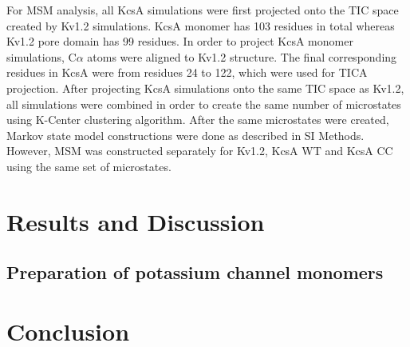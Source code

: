 For MSM analysis, all KcsA simulations were first projected onto the TIC space created by Kv1.2 simulations. KcsA monomer has 103 residues in total whereas Kv1.2 pore domain has 99 residues. In order to project KcsA monomer simulations, C$\alpha$ atoms were aligned to Kv1.2 structure. The final corresponding residues in KcsA were from residues 24 to 122, which were used for TICA projection. After projecting KcsA simulations onto the same TIC space as Kv1.2, all simulations were combined in order to create the same number of microstates using K-Center clustering algorithm. After the same microstates were created, Markov state model constructions were done as described in SI Methods. However, MSM was constructed separately for Kv1.2, KcsA WT and KcsA CC using the same set of microstates.

\section{Results and Discussion}
\subsection{Preparation of potassium channel monomers}
\subsection{}
\section{Conclusion}

\renewcommand\thefigure{\thechapter.\arabic{figure}} 


